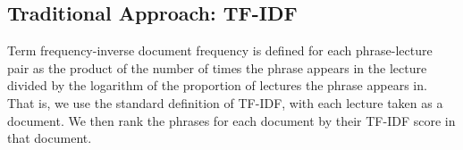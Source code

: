 \subsection{Traditional Approach: TF-IDF}
\label{sec:tfidf}


Term frequency-inverse document frequency is defined for each phrase-lecture pair as the product of the number of times the phrase appears in the lecture divided by the logarithm of the proportion of lectures the phrase appears in. That is, we use the standard definition of TF-IDF, with each lecture taken as a document. We then rank the phrases for each document by their TF-IDF score in that document.


